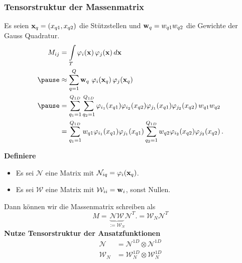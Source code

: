 \begin{frame}
\frametitle{Tensorstruktur der Massenmatrix}
Es seien $\bold{x}_q=(x_{q1},x_{q2})$ die Stützstellen und $\bold{w}_q=w_{q1}w_{q2}$ die Gewichte der Gauss Quadratur.
\begin{equation*} \label{eq:massapprox}
\begin{aligned}
M_{ij} &= \int\limits_{T} \varphi_i (\bold{x}) \, \varphi_j (\bold{x}) \, d\bold{x} \\ \pause
&\approx  \sum\limits_{q=1}^Q \bold{w}_q \, \, \varphi_i (\bold{x}_q) \, \varphi_j (\bold{x}_q) \\ \pause
&= \sum\limits_{q_1=1}^{Q_{1D}} \sum\limits_{q_2=1}^{Q_{1D}} \varphi_{i_1}(x_{q1}) \varphi_{i_2}(x_{q2}) \varphi_{j_1}(x_{q1}) \varphi_{j_2}(x_{q2}) \, w_{q1} w_{q2} \\ 
&= \sum\limits_{q_1=1}^{Q_{1D}} w_{q1} \varphi_{i_1}(x_{q1}) \varphi_{j_1}(x_{q1}) \sum\limits_{q_2=1}^{Q_{1D}} w_{q2} \varphi_{i_2}(x_{q2}) \varphi_{j_2}(x_{q2}) \, . 
\end{aligned}
\end{equation*}
\end{frame}

\begin{frame}
\textbf{Definiere} \\
\begin{itemize}
\item Es sei $\mathcal{N}$ eine Matrix mit $\mathcal{N}_{iq}=\varphi_i(\bold{x}_q)$.
\item Es sei $\mathcal{W}$ eine Matrix mit $\mathcal{W}_{ii}=\bold{w}_i$, sonst Nullen.
\end{itemize}
Dann können wir die Massenmatrix schreiben als
\begin{equation*}
M = \underbrace{\mathcal{N} \mathcal{W}}_{:=\mathcal{W}_N} \mathcal{N}^T. = \mathcal{W}_N \mathcal{N}^T
\end{equation*}
\pause
\textbf{Nutze Tensorstruktur der Ansatzfunktionen}
\begin{equation*}
\begin{aligned}
\mathcal{N} &= \mathcal{N}^{1D} \otimes \mathcal{N}^{1D} \\
\mathcal{W}_N &= \mathcal{W}_N^{1D} \otimes \mathcal{W}_N^{1D}
\end{aligned}
\end{equation*}
\end{frame}

